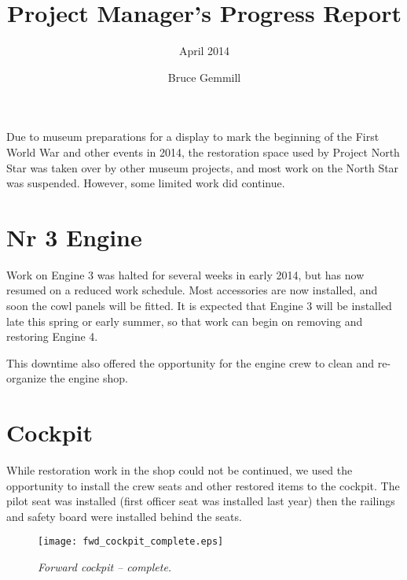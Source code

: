 %


\title{Project Manager's Progress Report}
\subtitle{April 2014}
\author{Bruce Gemmill}

\maketitle

Due to museum preparations for a display to mark the beginning of
the First World War and other events in 2014, the restoration
space used by Project North Star was taken over by other museum
projects, and most work on the North Star was suspended.
However, some limited work did continue.

\section{Nr 3 Engine}
\label{sec:engines_3}

Work on Engine 3 was halted for several weeks in early 2014, but
has now resumed on a reduced work schedule.  Most accessories are
now installed, and soon the cowl panels will be fitted.  It is
expected that Engine 3 will be installed late this spring or
early summer, so that work can begin on removing and restoring
Engine 4.

This downtime also offered the opportunity for the engine crew to
clean and re-organize the engine shop.

\section{Cockpit}
\label{cockpit}

While restoration work in the shop could not be continued, we
used the opportunity to install the crew seats and other restored
items to the cockpit.  The pilot seat was installed (first
officer seat was installed last year) then the railings and
safety board were installed behind the seats.  

\begin{figure}[htbp]
   \vspace{2em}
   \centering
   \texttt{[image: fwd\_cockpit\_complete.eps]}
   \caption*{\small \em Forward cockpit -- complete.}
   \label{fig:fwd_cockpit_complete}
\end{figure}

